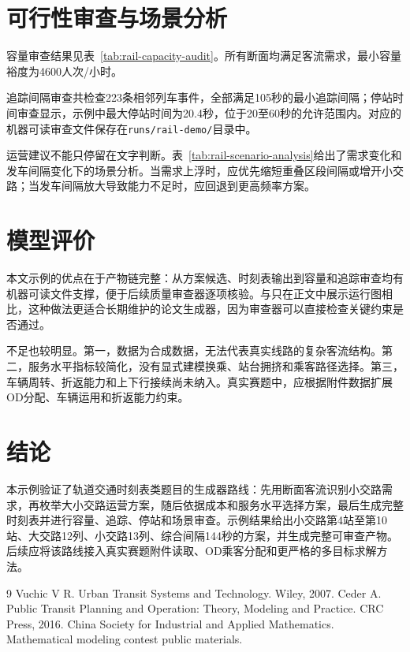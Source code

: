 \documentclass[withoutpreface]{cumcmthesis}
\begin{document}
\section{可行性审查与场景分析}

容量审查结果见表~\ref{tab:rail-capacity-audit}。所有断面均满足客流需求，最小容量裕度为4600人次/小时。



追踪间隔审查共检查223条相邻列车事件，全部满足105秒的最小追踪间隔；停站时间审查显示，示例中最大停站时间为20.4秒，位于20至60秒的允许范围内。对应的机器可读审查文件保存在\texttt{runs/rail-demo/}目录中。

运营建议不能只停留在文字判断。表~\ref{tab:rail-scenario-analysis}给出了需求变化和发车间隔变化下的场景分析。当需求上浮时，应优先缩短重叠区段间隔或增开小交路；当发车间隔放大导致能力不足时，应回退到更高频率方案。



\section{模型评价}

本文示例的优点在于产物链完整：从方案候选、时刻表输出到容量和追踪审查均有机器可读文件支撑，便于后续质量审查器逐项核验。与只在正文中展示运行图相比，这种做法更适合长期维护的论文生成器，因为审查器可以直接检查关键约束是否通过。

不足也较明显。第一，数据为合成数据，无法代表真实线路的复杂客流结构。第二，服务水平指标较简化，没有显式建模换乘、站台拥挤和乘客路径选择。第三，车辆周转、折返能力和上下行接续尚未纳入。真实赛题中，应根据附件数据扩展OD分配、车辆运用和折返能力约束。

\section{结论}

本示例验证了轨道交通时刻表类题目的生成器路线：先用断面客流识别小交路需求，再枚举大小交路运营方案，随后依据成本和服务水平选择方案，最后生成完整时刻表并进行容量、追踪、停站和场景审查。示例结果给出小交路第4站至第10站、大交路12列、小交路13列、综合间隔144秒的方案，并生成完整可审查产物。后续应将该路线接入真实赛题附件读取、OD乘客分配和更严格的多目标求解方法。

\begin{thebibliography}{9}
Vuchic V R. Urban Transit Systems and Technology. Wiley, 2007.
Ceder A. Public Transit Planning and Operation: Theory, Modeling and Practice. CRC Press, 2016.
China Society for Industrial and Applied Mathematics. Mathematical modeling contest public materials.
\end{thebibliography}
\end{document}
